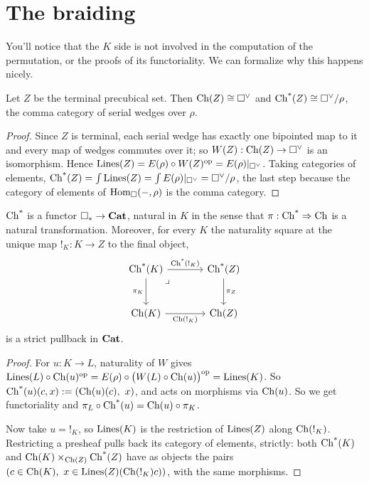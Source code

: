 \documentclass[11pt]{article}
\begin{document}
\section{The braiding}\label{sec:braiding}

You'll notice that the $K$ side is not involved in the computation of the permutation,
or the proofs of its functoriality. We can formalize why this happens nicely.

\begin{lemma}\label{lem:chs-Z}
  Let $Z$ be the terminal precubical set. 
  Then $\operatorname{Ch}(Z) \cong \square^{\vee}$ and  $\operatorname{Ch^*}(Z) \cong \square^{\vee}/\rho$, the comma category of serial
  wedges over $\rho$.
\end{lemma}
\begin{proof}
  Since $Z$ is terminal, each serial wedge has exactly one bipointed map to it and every map of
  wedges commutes over it; so $W(Z) : \operatorname{Ch}(Z) \to \square^{\vee}$ is an isomorphism. Hence
  $\operatorname{Lines}(Z) = E(\rho) \circ W(Z)^{\mathrm{op}} = E(\rho)|_{\square^{\vee}}$. Taking categories of elements,
  $\operatorname{Ch^*}(Z) = \int \operatorname{Lines}(Z) = \int E(\rho)|_{\square^{\vee}} = \square^{\vee}/\rho$, the last step because the category
  of elements of $\operatorname{Hom}_{\square}(-,\rho)$ is the comma category.
\end{proof}

\begin{lemma}\label{lem:pullback}
  $\operatorname{Ch^*}$ is a functor $\square_{*} \to \mathbf{Cat}$, natural in $K$ in the sense that
  $\pi : \operatorname{Ch^*} \Rightarrow \operatorname{Ch}$ is a natural transformation. Moreover, for every $K$ the naturality
  square at the unique map $!_K : K \to Z$ to the final object,
  \[
  \begin{tikzcd}[column sep=large, row sep=large]
    \Chs(K) \arrow[r, "\Chs(!_K)"] \arrow[d, "\pi_K"']
      \arrow[dr, phantom, very near start, "\lrcorner"]
      & \Chs(Z) \arrow[d, "\pi_Z"] \\
    \Ch(K) \arrow[r, "\Ch(!_K)"'] & \Ch(Z)
  \end{tikzcd}
  \]
  is a strict pullback in $\mathbf{Cat}$.
\end{lemma}
\begin{proof}
  For $u : K \to L$, naturality of $W$ gives
  $\operatorname{Lines}(L) \circ \operatorname{Ch}(u)^{\mathrm{op}} = E(\rho) \circ \bigl(W(L) \circ \operatorname{Ch}(u)\bigr)^{\mathrm{op}} = \operatorname{Lines}(K)$.
  So $\operatorname{Ch^*}(u)(c, x) := (\operatorname{Ch}(u)(c),\ x)$, and acts on morphisms via $\operatorname{Ch}(u)$.
  So we get functoriality and $\pi_L \circ \operatorname{Ch^*}(u) = \operatorname{Ch}(u) \circ \pi_K$.

  Now take $u = !_K$, so $\operatorname{Lines}(K)$ is the restriction of $\operatorname{Lines}(Z)$ along $\operatorname{Ch}(!_K)$.
  Restricting a presheaf pulls back its category of elements, strictly: both $\operatorname{Ch^*}(K)$ and
  $\operatorname{Ch}(K) \times_{\operatorname{Ch}(Z)} \operatorname{Ch^*}(Z)$ have as objects the pairs
  $(c \in \operatorname{Ch}(K),\ x \in \operatorname{Lines}(Z)(\operatorname{Ch}(!_K)c))$, with the same morphisms.
\end{proof}
\end{document}

